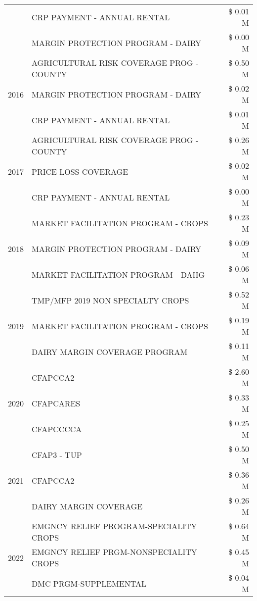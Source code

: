 \begin{tabular}{llr}
 & CRP PAYMENT - ANNUAL RENTAL & \$ 0.01 M \\
 & MARGIN PROTECTION PROGRAM - DAIRY & \$ 0.00 M \\
\cline{1-3}
\multirow[t]{3}{*}{2016} & AGRICULTURAL RISK COVERAGE PROG - COUNTY & \$ 0.50 M \\
 & MARGIN PROTECTION PROGRAM - DAIRY & \$ 0.02 M \\
 & CRP PAYMENT - ANNUAL RENTAL & \$ 0.01 M \\
\cline{1-3}
\multirow[t]{3}{*}{2017} & AGRICULTURAL RISK COVERAGE PROG - COUNTY & \$ 0.26 M \\
 & PRICE LOSS COVERAGE & \$ 0.02 M \\
 & CRP PAYMENT - ANNUAL RENTAL & \$ 0.00 M \\
\cline{1-3}
\multirow[t]{3}{*}{2018} & MARKET FACILITATION PROGRAM - CROPS & \$ 0.23 M \\
 & MARGIN PROTECTION PROGRAM - DAIRY & \$ 0.09 M \\
 & MARKET FACILITATION PROGRAM - DAHG & \$ 0.06 M \\
\cline{1-3}
\multirow[t]{3}{*}{2019} & TMP/MFP 2019 NON SPECIALTY CROPS & \$ 0.52 M \\
 & MARKET FACILITATION PROGRAM - CROPS & \$ 0.19 M \\
 & DAIRY MARGIN COVERAGE PROGRAM & \$ 0.11 M \\
\cline{1-3}
\multirow[t]{3}{*}{2020} & CFAPCCA2 & \$ 2.60 M \\
 & CFAPCARES & \$ 0.33 M \\
 & CFAPCCCCA & \$ 0.25 M \\
\cline{1-3}
\multirow[t]{3}{*}{2021} & CFAP3 - TUP & \$ 0.50 M \\
 & CFAPCCA2 & \$ 0.36 M \\
 & DAIRY MARGIN COVERAGE & \$ 0.26 M \\
\cline{1-3}
\multirow[t]{3}{*}{2022} & EMGNCY RELIEF PROGRAM-SPECIALITY CROPS & \$ 0.64 M \\
 & EMGNCY RELIEF PRGM-NONSPECIALITY CROPS & \$ 0.45 M \\
 & DMC PRGM-SUPPLEMENTAL & \$ 0.04 M \\
\cline{1-3}
\bottomrule
\end{tabular}
